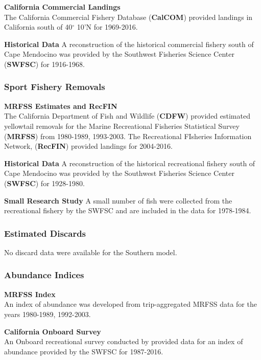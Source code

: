 \documentclass[12pt,]{article}
\begin{document}
\textbf{California Commercial Landings}\\
The California Commercial Fishery Database (\textbf{CalCOM}) provided
landings in California south of 40\(^\circ\) 10'N for 1969-2016.

\textbf{Historical Data} A reconstruction of the historical commercial
fishery south of Cape Mendocino was provided by the Southwest Fisheries
Science Center (\textbf{SWFSC}) for 1916-1968.

\subsubsection{Sport Fishery Removals}\label{sport-fishery-removals-1}

\textbf{MRFSS Estimates and RecFIN}\\
The California Department of Fish and Wildlife (\textbf{CDFW}) provided
estimated yellowtail removals for the Marine Recreational Fisheries
Statistical Survey (\textbf{MRFSS}) from 1980-1989, 1993-2003. The
Recreational FIsheries Information Network, (\textbf{RecFIN}) provided
landings for 2004-2016.

\textbf{Historical Data} A reconstruction of the historical recreational
fishery south of Cape Mendocino was provided by the Southwest Fisheries
Science Center (\textbf{SWFSC}) for 1928-1980.

\textbf{Small Research Study} A small number of fish were collected from
the recreational fishery by the SWFSC and are included in the data for
1978-1984.

\subsubsection{Estimated Discards}\label{estimated-discards-1}

No discard data were available for the Southern model.

\subsubsection{Abundance Indices}\label{abundance-indices-1}

\textbf{MRFSS Index}\\
An index of abundance was developed from trip-aggregated MRFSS data for
the years 1980-1989, 1992-2003.

\textbf{California Onboard Survey}\\
An Onboard recreational survey conducted by provided data for an index
of abundance provided by the SWFSC for 1987-2016.
\end{document}
